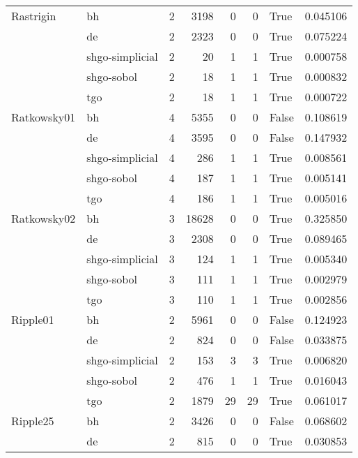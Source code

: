 \begin{longtable}{llrrrrlr}
Rastrigin & bh &     2 &     3198 &      0 &       0 &    True &    0.045106 \\
         & de &     2 &     2323 &      0 &       0 &    True &    0.075224 \\
         & shgo-simplicial &     2 &       20 &      1 &       1 &    True &    0.000758 \\
         & shgo-sobol &     2 &       18 &      1 &       1 &    True &    0.000832 \\
         & tgo &     2 &       18 &      1 &       1 &    True &    0.000722 \\
Ratkowsky01 & bh &     4 &     5355 &      0 &       0 &   False &    0.108619 \\
         & de &     4 &     3595 &      0 &       0 &   False &    0.147932 \\
         & shgo-simplicial &     4 &      286 &      1 &       1 &    True &    0.008561 \\
         & shgo-sobol &     4 &      187 &      1 &       1 &    True &    0.005141 \\
         & tgo &     4 &      186 &      1 &       1 &    True &    0.005016 \\
Ratkowsky02 & bh &     3 &    18628 &      0 &       0 &    True &    0.325850 \\
         & de &     3 &     2308 &      0 &       0 &    True &    0.089465 \\
         & shgo-simplicial &     3 &      124 &      1 &       1 &    True &    0.005340 \\
         & shgo-sobol &     3 &      111 &      1 &       1 &    True &    0.002979 \\
         & tgo &     3 &      110 &      1 &       1 &    True &    0.002856 \\
Ripple01 & bh &     2 &     5961 &      0 &       0 &   False &    0.124923 \\
         & de &     2 &      824 &      0 &       0 &   False &    0.033875 \\
         & shgo-simplicial &     2 &      153 &      3 &       3 &    True &    0.006820 \\
         & shgo-sobol &     2 &      476 &      1 &       1 &    True &    0.016043 \\
         & tgo &     2 &     1879 &     29 &      29 &    True &    0.061017 \\
Ripple25 & bh &     2 &     3426 &      0 &       0 &   False &    0.068602 \\
         & de &     2 &      815 &      0 &       0 &    True &    0.030853 \\

\end{longtable}
